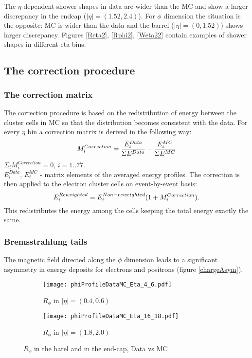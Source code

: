   The $\eta$-dependent shower shapes in data are wider than the MC and show a larger discrepancy in the endcap ($|\eta| = (1.52,2.4)$). For $\phi$ dimension the situation is the opposite: MC is wider than the data and the barrel ($|\eta| = (0,1.52)$) shows larger discrepancy. Figures \ref{Reta2}, \ref{Rphi2}, \ref{Weta22} contain examples of shower shapes in different eta bins. 
  \subsection{The correction procedure}
  \subsubsection{The correction matrix}
  The correction procedure is based on the redistribution of energy between the cluster cells in MC so that the distribution becomes consistent with the data. For every $\eta$ bin a correction matrix is derived in the following way:
  \begin{equation}
  \nonumber
  \large {M_{i}^{Correction} = \frac{E_{i}^{Data}}{\Sigma E^{Data}} - \frac{E_{i}^{MC}}{\Sigma E^{MC}}}
  \end{equation}
  $\Sigma_i M_i^{Correction} = 0$, $i = 1..77$.\\
  $E_i^{Data}$, $E_i^{MC}$ - matrix elements of the averaged energy profiles. 
  The correction is then applied to the electron cluster cells on event-by-event basis:
  \begin{equation}
  \nonumber
  \large {E_{i}^{Reweighted} = {E_{i}^{Non-reweighted}(1+M_{i}^{Correction}).}}
  \end{equation}
  This redistributes the energy among the cells keeping the total energy exactly the same.
  \subsubsection{Bremsstrahlung tails}
  The magnetic field directed along the $\phi$ dimension leads to a significant asymmetry in energy deposits for electrons and positrons (figure \ref{chargeAsym}). 
  
  
      \begin{figure}[htbp]
  	\begin{subfigure}[t]{0.5\textwidth}
  		\texttt{[image: phiProfileDataMC\_Eta\_4\_6.pdf]}
  		\caption{$R_{\phi}$ in $|\eta| = (0.4,0.6)$ }
  		\label{fig::rphi_norew_04}
  	\end{subfigure}
  	\hfill
  	\begin{subfigure}[t]{0.5\textwidth} 
  		\texttt{[image: phiProfileDataMC\_Eta\_16\_18.pdf]}
  		\caption{$R_{\phi}$ in $|\eta| = (1.8,2.0)$ }
  		\label{fig::rphi_norew_18}
  	\end{subfigure}
  	\caption{$R_{\phi}$ in the barel and in the end-cap, Data vs MC}
  	\label{fig::rphi_norew}
  \end{figure}

